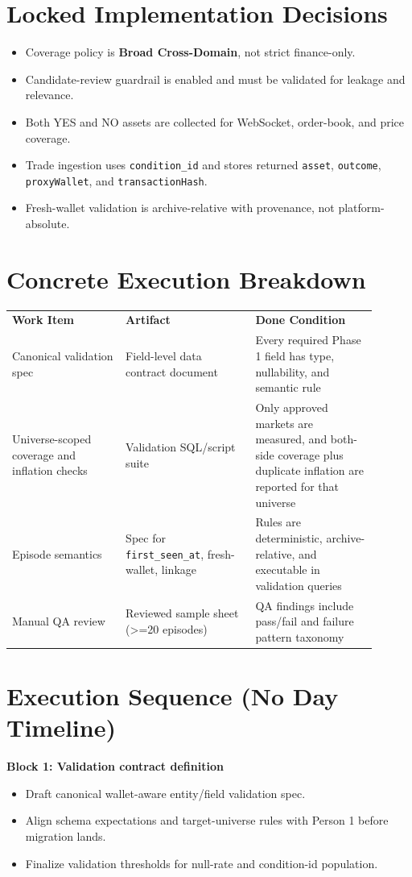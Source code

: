 \documentclass{article}
\begin{document}
\section*{Locked Implementation Decisions}
\begin{itemize}
\item Coverage policy is \textbf{Broad Cross-Domain}, not strict finance-only.
\item Candidate-review guardrail is enabled and must be validated for leakage and relevance.
\item Both YES and NO assets are collected for WebSocket, order-book, and price coverage.
\item Trade ingestion uses \texttt{condition\_id} and stores returned \texttt{asset}, \texttt{outcome}, \texttt{proxyWallet}, and \texttt{transactionHash}.
\item Fresh-wallet validation is archive-relative with provenance, not platform-absolute.
\end{itemize}

\section*{Concrete Execution Breakdown}
\begin{longtable}{p{0.28\linewidth}p{0.32\linewidth}p{0.30\linewidth}}
\textbf{Work Item} & \textbf{Artifact} & \textbf{Done Condition} \\
Canonical validation spec & Field-level data contract document & Every required Phase 1 field has type, nullability, and semantic rule \\
Universe-scoped coverage and inflation checks & Validation SQL/script suite & Only approved markets are measured, and both-side coverage plus duplicate inflation are reported for that universe \\
Episode semantics & Spec for \texttt{first\_seen\_at}, fresh-wallet, linkage & Rules are deterministic, archive-relative, and executable in validation queries \\
Manual QA review & Reviewed sample sheet (>=20 episodes) & QA findings include pass/fail and failure pattern taxonomy \\
\end{longtable}

\section*{Execution Sequence (No Day Timeline)}
\textbf{Block 1: Validation contract definition}
\begin{itemize}
\item Draft canonical wallet-aware entity/field validation spec.
\item Align schema expectations and target-universe rules with Person 1 before migration lands.
\item Finalize validation thresholds for null-rate and condition-id population.
\end{itemize}
\end{document}
